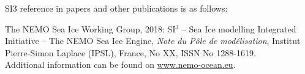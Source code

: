 \documentclass[../main/SI3_manual]{subfiles}
\begin{document}
\vspace{1cm}
SI3 reference in papers and other publications is as follows:
\vspace{0.5cm}

The NEMO Sea Ice Working Group, 2018: SI$^3$ -- Sea Ice modelling Integrated Initiative -- The NEMO Sea Ice Engine, \textit{Note du P\^ole de mod\'{e}lisation}, Institut Pierre-Simon Laplace (IPSL), France, 
No XX, ISSN No 1288-1619.\\

\vspace{0.5cm}
Additional information can be found on \href{http://www.nemo-ocean.eu/}{www.nemo-ocean.eu}.
\vspace{0.5cm}
\end{document}

